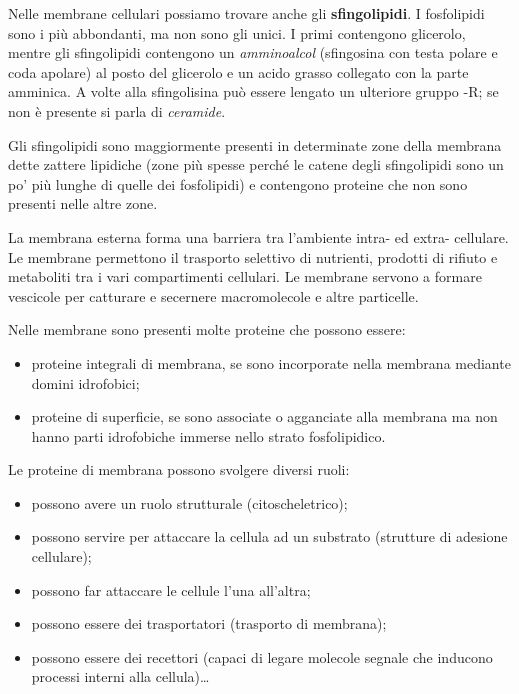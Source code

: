 \documentclass[]{article}
\begin{document}
Nelle membrane cellulari possiamo trovare anche gli
\textbf{sfingolipidi}. I fosfolipidi sono i più abbondanti, ma non sono
gli unici. I primi contengono glicerolo, mentre gli sfingolipidi
contengono un \emph{amminoalcol} (sfingosina con testa polare e coda
apolare) al posto del glicerolo e un acido grasso collegato con la parte
amminica. A volte alla sfingolisina può essere lengato un ulteriore
gruppo -R; se non è presente si parla di \emph{ceramide}.

Gli sfingolipidi sono maggiormente presenti in determinate zone della
membrana dette zattere lipidiche (zone più spesse perché le catene degli
sfingolipidi sono un po' più lunghe di quelle dei fosfolipidi) e
contengono proteine che non sono presenti nelle altre zone.

La membrana esterna forma una barriera tra l'ambiente intra- ed extra-
cellulare. Le membrane permettono il trasporto selettivo di nutrienti,
prodotti di rifiuto e metaboliti tra i vari compartimenti cellulari. Le
membrane servono a formare vescicole per catturare e secernere
macromolecole e altre particelle.

Nelle membrane sono presenti molte proteine che possono essere:

\begin{itemize}
\itemsep1pt\parskip0pt
\item
  proteine integrali di membrana, se sono incorporate nella membrana
  mediante domini idrofobici;
\item
  proteine di superficie, se sono associate o agganciate alla membrana
  ma non hanno parti idrofobiche immerse nello strato fosfolipidico.
\end{itemize}

Le proteine di membrana possono svolgere diversi ruoli:

\begin{itemize}
\itemsep1pt\parskip0pt
\item
  possono avere un ruolo strutturale (citoscheletrico);
\item
  possono servire per attaccare la cellula ad un substrato (strutture di
  adesione cellulare);
\item
  possono far attaccare le cellule l'una all'altra;
\item
  possono essere dei trasportatori (trasporto di membrana);
\item
  possono essere dei recettori (capaci di legare molecole segnale che
  inducono processi interni alla cellula)\ldots{}
\end{itemize}
\end{document}

